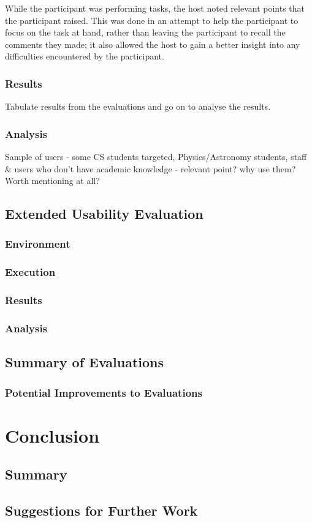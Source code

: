 \documentclass{l4proj}
\begin{document}
While the participant was performing tasks, the host noted relevant points that the participant raised.  This was done in an attempt to help the participant to focus on the task at hand, rather than leaving the participant to recall the comments they made; it also allowed the host to gain a better insight into any difficulties encountered by the participant.

\subsection{Results}
Tabulate results from the evaluations and go on to analyse the results.

\subsection{Analysis}
Sample of users - some CS students targeted, Physics/Astronomy students, staff \& users who don't have academic knowledge - relevant point? why use them? Worth mentioning at all?

\section{Extended Usability Evaluation}
\subsection{Environment}
\subsection{Execution}
\subsection{Results}
\subsection{Analysis}

\section{Summary of Evaluations}

\subsection{Potential Improvements to Evaluations}



\chapter{Conclusion}
\label{conclusion}

\section{Summary}

\section{Suggestions for Further Work}

\appendix
\printglossaries



\end{document}
